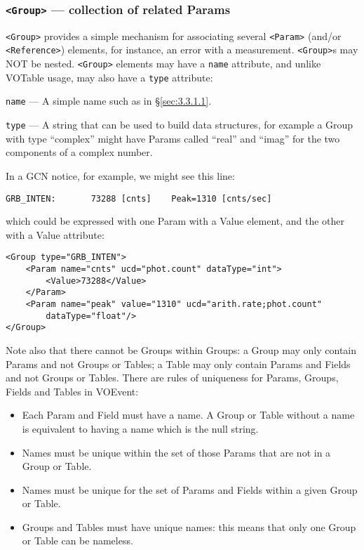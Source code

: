 \documentclass[11pt,a4paper]{ivoa}
\begin{document}
\subsubsection{{\tt <Group>} --- collection of related Params}
\label{sec:3.3.2}
{\tt <Group>} provides a simple mechanism for associating several {\tt <Param>}
(and/or {\tt <Reference>}) elements, for instance, an error with a measurement.
{\tt <Group>}s may NOT be nested. {\tt <Group>} elements may have a {\tt name}
attribute, and unlike VOTable usage, may also have a {\tt type} attribute:

 {\tt name}\label{sec:3.3.2.1} --- A simple name such as
in \S\ref{sec:3.3.1.1}.

 {\tt type}\label{sec:3.3.2.2} --- A string that can be
used to build data structures, for example a Group with type ``complex'' might
have Params called ``real'' and ``imag'' for the two components of a complex
number.

In a GCN notice, for example, we might see this line:
\begin{lstlisting}
GRB_INTEN:       73288 [cnts]    Peak=1310 [cnts/sec]
\end{lstlisting}
which could be expressed with one Param with a Value element, and the other with
a Value attribute:
\begin{lstlisting}
<Group type="GRB_INTEN">
    <Param name="cnts" ucd="phot.count" dataType="int">
        <Value>73288</Value>
    </Param>
    <Param name="peak" value="1310" ucd="arith.rate;phot.count"
        dataType="float"/>
</Group>
\end{lstlisting}
Note also that there cannot be Groups within Groups: a Group may only contain
Params and not Groups or Tables; a Table may only contain Params and Fields and
not Groups or Tables. There are rules of uniqueness for Params, Groups, Fields
and Tables in VOEvent:
\begin{itemize}
\item Each Param and Field must have a name. A Group or Table without a name is
equivalent to having a name which is the null string.
\item Names must be unique within the set of those Params that are not in a
Group or Table.
\item Names must be unique for the set of Params and Fields within a given Group
or Table.
\item Groups and Tables must have unique names: this means that only one Group
or Table can be nameless.
\end{itemize}
\end{document}
